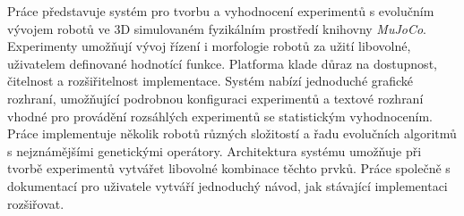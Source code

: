 \documentclass[12pt]{report}
\begin{document}
Práce představuje systém pro tvorbu a vyhodnocení experimentů s evolučním
vývojem robotů ve 3D simulovaném fyzikálním prostředí knihovny \emph{MuJoCo}.
Experimenty umožňují vývoj řízení i morfologie robotů za užití libovolné,
uživatelem definované hodnotící funkce. Platforma klade důraz na dostupnost,
čitelnost a rozšiřitelnost implementace. Systém nabízí jednoduché grafické
rozhraní, umožňující podrobnou konfiguraci experimentů a textové rozhraní
vhodné pro provádění rozsáhlých experimentů se statistickým vyhodnocením. Práce
implementuje několik robotů různých složitostí a řadu evolučních algoritmů s
nejznámějšími genetickými operátory. Architektura systému umožňuje při
tvorbě experimentů vytvářet libovolné kombinace těchto prvků. Práce společně s
dokumentací pro uživatele vytváří jednoduchý návod, jak stávající implementaci
rozšiřovat.
\end{document}

